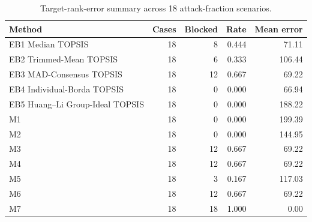 \begin{table}[H]
\centering
\small
\caption{Target-rank-error summary across 18 attack-fraction scenarios.}
\label{tab:method-summary}
\begin{tabular}{lrrrr}
\toprule
Method & Cases & Blocked & Rate & Mean error \\
\midrule
EB1 Median TOPSIS & 18 & 8 & 0.444 & 71.11 \\
EB2 Trimmed-Mean TOPSIS & 18 & 6 & 0.333 & 106.44 \\
EB3 MAD-Consensus TOPSIS & 18 & 12 & 0.667 & 69.22 \\
EB4 Individual-Borda TOPSIS & 18 & 0 & 0.000 & 66.94 \\
EB5 Huang--Li Group-Ideal TOPSIS & 18 & 0 & 0.000 & 188.22 \\
M1 & 18 & 0 & 0.000 & 199.39 \\
M2 & 18 & 0 & 0.000 & 144.95 \\
M3 & 18 & 12 & 0.667 & 69.22 \\
M4 & 18 & 12 & 0.667 & 69.22 \\
M5 & 18 & 3 & 0.167 & 117.03 \\
M6 & 18 & 12 & 0.667 & 69.22 \\
M7 & 18 & 18 & 1.000 & 0.00 \\
\bottomrule
\end{tabular}
\end{table}
